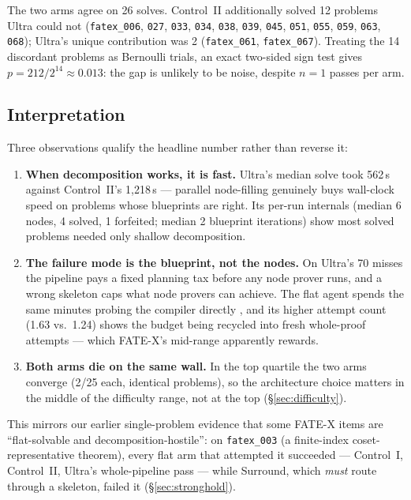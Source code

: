 \documentclass[12pt, a4paper]{article}
\newcommand{\run}[1]{\texttt{#1}}
\begin{document}
The two arms agree on 26 solves. Control~II additionally solved 12 problems
Ultra could not (\run{fatex\_006}, \run{027}, \run{033}, \run{034},
\run{038}, \run{039}, \run{045}, \run{051}, \run{055}, \run{059}, \run{063},
\run{068}); Ultra's unique contribution was 2 (\run{fatex\_061},
\run{fatex\_067}). Treating the 14 discordant problems as Bernoulli trials, an
exact two-sided sign test gives $p = 212/2^{14} \approx 0.013$: the gap is
unlikely to be noise, despite $n=1$ passes per arm.

\subsection{Interpretation}

Three observations qualify the headline number rather than reverse it:

\begin{enumerate}[itemsep=2pt]
\item \textbf{When decomposition works, it is fast.} Ultra's median solve took
      562\,s against Control~II's 1{,}218\,s --- parallel node-filling
      genuinely buys wall-clock speed on problems whose blueprints are right.
      Its per-run internals (median 6 nodes, 4 solved, 1 forfeited;
      median 2 blueprint iterations) show most solved problems needed only
      shallow decomposition.
\item \textbf{The failure mode is the blueprint, not the nodes.} On Ultra's
      70 misses the pipeline pays a fixed planning tax before any node prover
      runs, and a wrong skeleton caps what node provers can achieve. The flat
      agent spends the same minutes probing the compiler directly
      \cite{yao2023react}, and its higher attempt count (1.63 vs.\ 1.24)
      shows the budget being recycled into fresh whole-proof attempts ---
      which FATE-X's mid-range apparently rewards.
\item \textbf{Both arms die on the same wall.} In the top quartile the two
      arms converge (2/25 each, identical problems), so the architecture
      choice matters in the middle of the difficulty range, not at the top
      (\S\ref{sec:difficulty}).
\end{enumerate}

This mirrors our earlier single-problem evidence that some FATE-X items are
``flat-solvable and decomposition-hostile'': on \run{fatex\_003}
(a finite-index coset-representative theorem), every flat arm that attempted
it succeeded --- Control~I, Control~II, Ultra's whole-pipeline pass --- while
Surround, which \emph{must} route through a skeleton, failed it
(\S\ref{sec:stronghold}).
\end{document}
